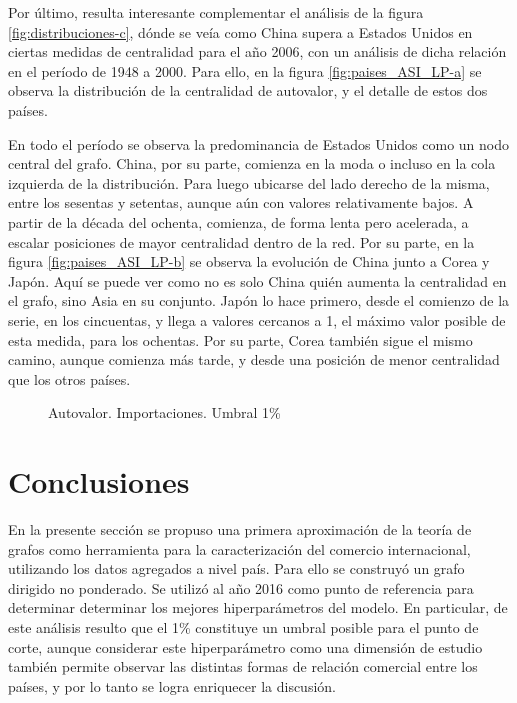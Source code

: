 \documentclass[class=article, crop=false]{standalone}
\begin{document}
Por último, resulta interesante complementar el análisis de la figura \ref{fig:distribuciones-c}, dónde se veía como China supera a Estados Unidos en ciertas medidas de centralidad para el año 2006, con un análisis de dicha relación en el período de 1948 a 2000. Para ello, en la figura \ref{fig:paises_ASI_LP-a} se observa la distribución de la centralidad de autovalor, y el detalle de estos dos países. \par
En todo el período se observa la predominancia de Estados Unidos como un nodo central del grafo. China, por su parte, comienza en la moda o incluso en la cola izquierda de la distribución. Para luego ubicarse del lado derecho de la misma, entre los sesentas y setentas, aunque aún con valores relativamente bajos. A partir de la década del ochenta, comienza, de forma lenta pero acelerada, a escalar posiciones de mayor centralidad dentro de la red. 
Por su parte, en la figura \ref{fig:paises_ASI_LP-b} se observa la evolución de China junto a Corea y Japón. Aquí se puede ver como no es solo China quién aumenta la centralidad en el grafo, sino Asia en su conjunto. Japón lo hace primero, desde el comienzo de la serie, en los cincuentas, y llega a valores cercanos a 1, el máximo valor posible de esta medida, para los ochentas. Por su parte, Corea también sigue el mismo camino, aunque comienza más tarde, y desde una posición de menor centralidad que los otros países. 

\begin{figure}[h!]
	\centering
	\caption{Autovalor. Importaciones. Umbral 1\%}
	\label{fig:paises_ASI_LP}
\end{figure}


\section{Conclusiones}

En la presente sección se propuso una primera aproximación de la teoría de grafos como herramienta para la caracterización del comercio internacional, utilizando los datos agregados a nivel país. Para ello se construyó un grafo dirigido no ponderado. Se utilizó al año 2016 como punto de referencia para determinar determinar los mejores hiperparámetros del modelo. En particular, de este análisis resulto que el 1\% constituye un umbral posible para el punto de corte, aunque considerar este hiperparámetro como una dimensión de estudio también permite observar las distintas formas de relación comercial entre los países, y por lo tanto se logra enriquecer la discusión. 
\end{document}
